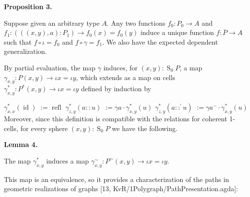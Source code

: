  
 
\par\medskip\noindent\textbf{Proposition 3.}\par
 
 
Suppose given an arbitrary type $A$. Any two functions $f_{0}:P_{0}\to A$ and $f_{1}:(((x,y),a):P_{1})\to f_{0}(x)=f_{0}(y)$ induce a unique function $f:\overline{P}\to A$ such that $f\circ\iota=f_{0}$ and $f\circ\gamma=f_{1}$. We also have the expected dependent generalization.\par
 
 
 
 
By partial evaluation, the map $\gamma$ induces, for $(x,y):\operatorname{S}_{0}P$, a map $\gamma_{x,y}:P(x,y)\to\iota x=\iota y$, which extends as a map on cells $\gamma^{*}_{x,y}:P^{*}(x,y)\to\iota x=\iota y$ defined by induction by\par
    $\displaystyle\gamma^{*}_{x,x}(\operatorname{id})$ $\displaystyle:=\operatorname{refl}$ $\displaystyle\gamma^{*}_{z,y}(a::u)$ $\displaystyle:=\gamma a\cdot{\gamma^{*}_{x,y}(u)}$ $\displaystyle\gamma^{*}_{z,y}(a::^{\prime}u)$ $\displaystyle:=\gamma a^{-}\cdot{\gamma^{*}_{x,y}(u)}$    
Moreover, since this definition is compatible with the relations for coherent 1-cells, for every sphere $(x,y):\operatorname{S}_{0}P$ we have the following.\par
 
 
 
\par\medskip\noindent\textbf{Lemma 4.}\par
 
 
The map $\gamma^{*}_{x,y}$ induces a map $\gamma^{\sim}_{x,y}:P^{\sim}(x,y)\to\iota x=\iota y$.\par
 
 
 
 
This map is an equivalence, so it provides a characterization of the paths in geometric realizations of graphs [13, KvR/1Polygraph/PathPresentation.agda]:\par
 
